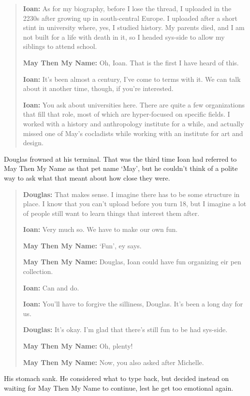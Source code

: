 \begin{quote}
\textbf{Ioan:} As for my biography, before I lose the thread, I uploaded in the 2230s after growing up in south-central Europe. I uploaded after a short stint in university where, yes, I studied history. My parents died, and I am not built for a life with death in it, so I headed sys-side to allow my siblings to attend school.

\textbf{May Then My Name:} Oh, Ioan. That is the first I have heard of this.

\textbf{Ioan:} It's been almost a century, I've come to terms with it. We can talk about it another time, though, if you're interested.

\textbf{Ioan:} You ask about universities here. There are quite a few organizations that fill that role, most of which are hyper-focused on specific fields. I worked with a history and anthropology institute for a while, and actually missed one of May's cocladists while working with an institute for art and design.
\end{quote}

\noindent Douglas frowned at his terminal. That was the third time Ioan had referred to May Then My Name as that pet name `May', but he couldn't think of a polite way to ask what that meant about how close they were.

\begin{quote}
\textbf{Douglas:} That makes sense. I imagine there has to be some structure in place. I know that you can't upload before you turn 18, but I imagine a lot of people still want to learn things that interest them after.

\textbf{Ioan:} Very much so. We have to make our own fun.

\textbf{May Then My Name:} `Fun', ey says.

\textbf{May Then My Name:} Douglas, Ioan could have fun organizing eir pen collection.

\textbf{Ioan:} Can and do.

\textbf{Ioan:} You'll have to forgive the silliness, Douglas. It's been a long day for us.

\textbf{Douglas:} It's okay. I'm glad that there's still fun to be had sys-side.

\textbf{May Then My Name:} Oh, plenty!

\textbf{May Then My Name:} Now, you also asked after Michelle.
\end{quote}

\noindent His stomach sank. He considered what to type back, but decided instead on waiting for May Then My Name to continue, lest he get too emotional again.

